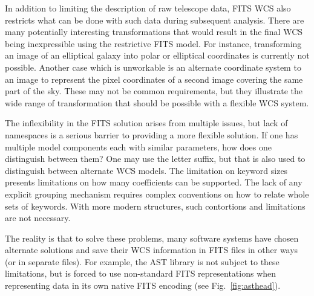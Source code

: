 \documentclass[final,authoryear,5p,times,twocolumn]{elsarticle}
\begin{document}
In addition to limiting the description of raw telescope data, FITS
WCS also restricts what can be done with such data during subsequent
analysis. There are many potentially interesting transformations that
would result in the final WCS being inexpressible using the
restrictive FITS model. For instance, transforming an image of an
elliptical galaxy into polar or elliptical coordinates is currently not possible. Another
case which is unworkable is an alternate coordinate system to an image to
represent the pixel coordinates of a second image covering the same
part of the sky.  These may not be common requirements, but they
illustrate the wide range of transformation that should be possible
with a flexible WCS system.


The inflexibility in the FITS solution arises from multiple issues,
but lack of namespaces is a serious barrier to providing a more
flexible solution. If one has multiple model components each with
similar parameters, how does one distinguish between them? One may use
the letter suffix, but that is also used to distinguish between
alternate WCS models. The limitation on keyword sizes presents
limitations on how many coefficients can be supported. The lack of any
explicit grouping mechanism requires complex conventions on how to
relate whole sets of keywords. With more modern structures, such
contortions and limitations are not necessary.


The reality is that to solve these problems, many software systems
have chosen alternate solutions and save their WCS information in FITS
files in other ways (or in separate files). For example, the AST
library \citep{1998ASPC..145...41W,2012ASPC..461..825B} is not subject
to these limitations, but is forced to use non-standard FITS
representations when representing data in its own native FITS
encoding (see Fig.\ \ref{fig:asthead}).
\end{document}
